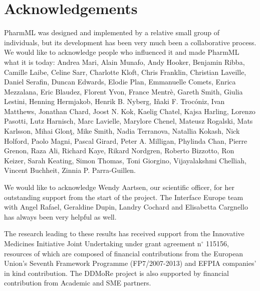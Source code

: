 \chapter*{Acknowledgements}

PharmML was designed and implemented by a relative small group of individuals, 
but its development has been very much been a collaborative process.
We would like to acknowledge people who influenced it and made PharmML
what it is today: Andrea Mari, Alain Munafo, Andy Hooker, 
Benjamin Ribba, Camille Laibe, Celine Sarr, Charlotte Kloft, Chris Franklin, 
Christian Laveille, Daniel Serafin, Duncan Edwards, Elodie Plan, 
Emmanuelle Comets, Enrica Mezzalana, Eric Blaudez, Florent Yvon, France Mentr\`{e}, 
Gareth Smith, Giulia Lestini, Henning Hermjakob, Henrik B. Nyberg, 
I\~{n}aki F. Troc\'{o}niz, Ivan Matthews, Jonathan Chard, Joost N. Kok, Kaelig Chatel, 
Kajsa Harling, Lorenzo Pasotti, Lutz Harnisch, Marc Lavielle, 
Marylore Chenel, Mateusz Rogalski, Mats Karlsson, Mihai Glon\c{t}, Mike Smith, 
Nadia Terranova, Natallia Kokash, Nick Holford, Paolo Magni, Pascal Girard, Peter A. Milligan, 
Phylinda Chan, Pierre Grenon, Raza Ali, Richard Kaye, Rikard Nordgren, Roberto Bizzotto, 
Ron Keizer, Sarah Keating, Simon Thomas, Toni Giorgino, Vijayalakshmi Chelliah, 
Vincent Buchheit, Zinnia P. Parra-Guillen.

We would like to acknowledge Wendy Aartsen, our scientific officer, for her outstanding support
from the start of the project. The Interface Europe team with  Angel Rafael, Geraldine Dupin, 
Landry Cochard and Elisabetta Cargnello has always been very helpful as well.

The research leading to these results has received support from the Innovative Medicines 
Initiative Joint Undertaking under grant agreement n$^{\circ}$ 115156, resources of which are 
composed of financial contributions from the European Union's Seventh Framework 
Programme (FP7/2007-2013) and EFPIA companies' in kind contribution. The DDMoRe 
project is also supported by financial contribution from Academic and SME partners.